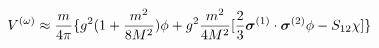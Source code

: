 \begin{equation}
V^{(\omega)} \approx \frac{m}{4 \pi} \{ g^{2} ( 1 + \frac{m^{2}}{8M^{2}}) \phi
+g^{2} \frac{m^{2}}{4M^{2}} [\frac{2}{3} \mbox{\boldmath $\sigma$}^{(1)} \cdot 
\mbox{\boldmath $\sigma$}^{(2)} \phi - S_{12} \chi] \}           \label{eq:bb}
\end{equation}


